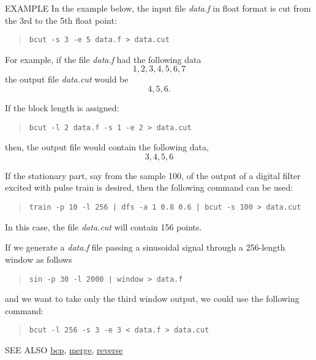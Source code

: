 \begin{qsection}{EXAMPLE}
In the example below, the input file {\em data.f} in float format
is cut from the 3rd to the 5th float point:
\begin{quote}
 \verb!bcut -s 3 -e 5 data.f > data.cut!
\end{quote}
For example, if the file {\em data.f} had the following data
\begin{displaymath}
  1, 2, 3, 4, 5, 6, 7
\end{displaymath}
the output file {\em data.cut} would be 
\begin{displaymath}
  4, 5, 6.
\end{displaymath}
\par
If the block length is assigned:
\begin{quote}
 \verb!bcut -l 2 data.f -s 1 -e 2 > data.cut!
\end{quote}
then, the output file would contain the following data,
\begin{displaymath}
  3, 4, 5, 6
\end{displaymath}
\par
If the stationary part, say from the sample 100,
of the output of a digital filter excited with
pulse train is desired, then the following command can be used:
\begin{quote}
  \verb!train -p 10 -l 256 | dfs -a 1 0.8 0.6 | bcut -s 100 > data.cut!
\end{quote}
In this case, the file {\em data.cut} will contain 156 points.
\par
If we generate a {\em data.f} file passing a sinusoidal signal
through a 256-length window as follows
\begin{quote}
  \verb!sin -p 30 -l 2000 | window > data.f!
\end{quote}
and we want to take only the third window output,
we could use the following command:
\begin{quote}
  \verb!bcut -l 256 -s 3 -e 3 < data.f > data.cut!
\end{quote}
\end{qsection}

\begin{qsection}{SEE ALSO}
\hyperlink{bcp}{bcp},
\hyperlink{merge}{merge},
\hyperlink{reverse}{reverse}
\end{qsection}

